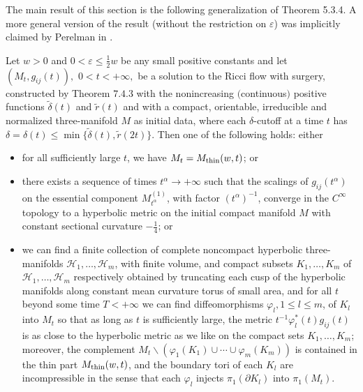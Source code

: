 The main result of this section is the following generalization of
Theorem 5.3.4. A more general version of the result (without the
restriction on $\varepsilon$) was implicitly claimed by Perelman
in \cite{P2}.

\begin{theorem}
  \label{thm:cz-surgery-long-time-geometry}

Let $w\!>0$ and $0<\!\varepsilon\leq\!\frac{1}{2}w$ be any small
positive constants and let $(M_t,g_{ij}(t)),$ $0<t<+\infty,$ be a
solution to the Ricci flow with surgery, constructed by Theorem
$7.4.3$ with the nonincreasing $($continuous$)$ positive functions
$\widetilde{\delta}(t)$ and $\widetilde{r}(t)$ and with a compact,
orientable, irreducible and normalized three-manifold $M$ as
initial data, where each $\delta$-cutoff at a time $t$ has
$\delta=\delta(t) \leq \min
\{\widetilde{\delta}(t),\widetilde{r}(2t)\}$. Then one of the
following holds: either
\begin{itemize}
\item[(i)] for all sufficiently large $t$, we have $M_t = M_{\rm
thin}(w,t)$; or \item[(ii)] there exists a sequence of times
$t^{\alpha}\rightarrow+\infty$ such that the scalings of
$g_{ij}(t^{\alpha})$ on the essential component
$M_{t^\alpha}^{(1)}$, with factor $(t^{\alpha})^{-1}$, converge in
the $C^{\infty}$ topology to a hyperbolic metric on the initial
compact manifold $M$ with constant sectional curvature
$-\frac{1}{4}$; or \item[(iii)] we can find a finite collection of
complete noncompact hyperbolic three-manifolds
$\mathcal{H}_1,\ldots,\mathcal{H}_m$, with finite volume, and
compact subsets $K_1,\ldots,K_m$ of
$\mathcal{H}_1,\ldots,\mathcal{H}_m$ respectively obtained by
truncating each cusp of the hyperbolic manifolds along constant
mean curvature torus of small area, and for all $t$ beyond some
time $T<+\infty$ we can find diffeomorphisms $\varphi_l,1\leq
l\leq m$, of $K_l$ into $M_t$ so that as long as $t$ is
sufficiently large, the metric $t^{-1}\varphi^*_l(t)g_{ij}(t)$ is
as close to the hyperbolic metric as we like on the compact sets
$K_1,\ldots,K_m$; moreover, the complement $M_t\backslash
(\varphi_1(K_1)\cup\cdots\cup\varphi_m(K_m))$ is contained in the
thin part $M_{\rm thin}(w,t)$, and the boundary tori of each $K_l$
are incompressible in the sense that each $\varphi_l$ injects
$\pi_1(\partial K_l)$ into $\pi_1(M_t)$.
\end{itemize}
\end{theorem}

